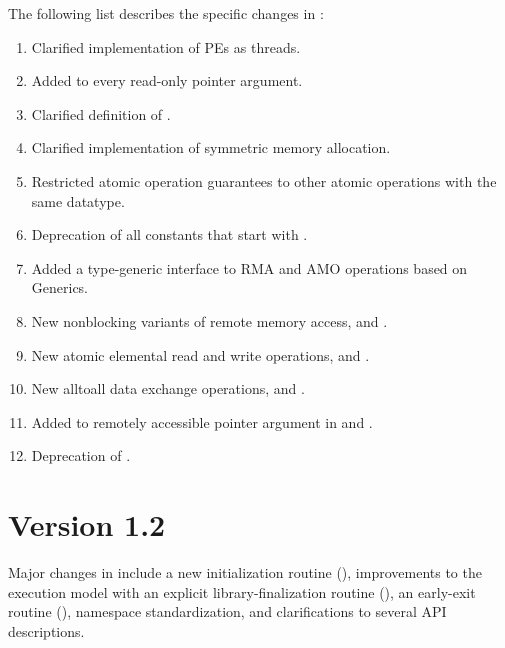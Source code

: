 The following list describes the specific changes in \openshmem[1.3]:
\begin{enumerate}
%
\item Clarified implementation of \acp{PE} as threads.
%
\item Added  to every read-only pointer argument.
%
\item Clarified definition of .
%
%
\item Clarified implementation of symmetric memory allocation.
%
%
\item Restricted atomic operation guarantees to other atomic operations with the same datatype.
%
%
\item Deprecation of all constants that start with .
%
%
\item Added a type-generic interface to \openshmem \ac{RMA} and \ac{AMO}
    operations based on \Cstd[11] Generics.
%
%
\item New nonblocking variants of remote memory access, 
    and .
%
%
\item New atomic elemental read and write operations,  and
    .
%
%
\item New alltoall data exchange operations, 
    and .
%
%
\item Added  to remotely accessible pointer argument in
     and .
%
%
\item Deprecation of .
%
%
\end{enumerate}




\section{Version 1.2}
Major changes in \openshmem[1.2] include
a new initialization routine (),
improvements to the execution model with an explicit
library-finalization routine (),
an early-exit routine (),
namespace standardization,
and clarifications to several \ac{API} descriptions.

